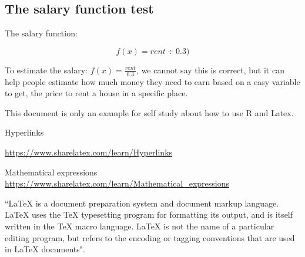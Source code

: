 \documentclass{article}
\begin{document}




\subsection{The salary function test}

The salary function:

 \begin{equation}
 f(x)  = rent \div 0.3 )
 \end{equation}
 
 
To estimate the salary: \(f(x) = \displaystyle \frac{rent}{0.3}\), we cannot say this is correct, but it can help people estimate how much money they need to earn based on a easy variable to get, the price to rent a house in a specific place. 
 
This document is only an example for self study about how to use R and Latex.


Hyperlinks

\url{https://www.sharelatex.com/learn/Hyperlinks}


Mathematical expressions
\url{https://www.sharelatex.com/learn/Mathematical_expressions}


\begin{flushleft}
``LaTeX is a document preparation system and document markup 
language. LaTeX uses the TeX typesetting program for formatting 
its output, and is itself written in the TeX macro language. 
LaTeX is not the name of a particular editing program, but refers 
to the encoding or tagging conventions that are used in LaTeX documents".
\end{flushleft}
\end{document}
